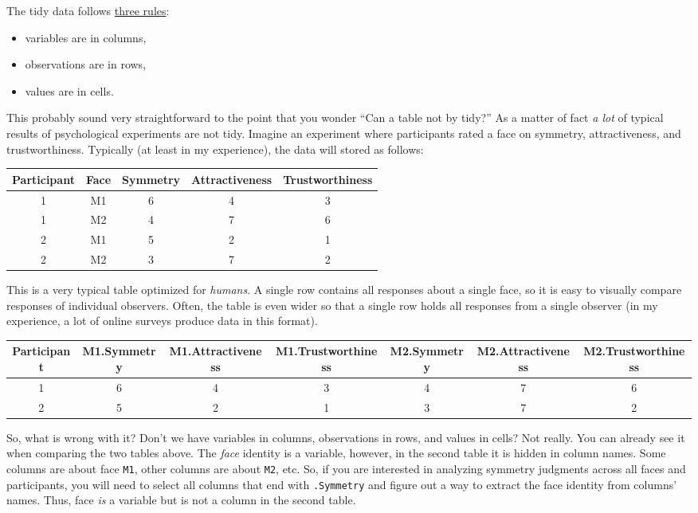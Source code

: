 \documentclass[
]{book}
\providecommand{\tightlist}{%
  \setlength{\itemsep}{0pt}\setlength{\parskip}{0pt}}
\begin{document}
The tidy data follows \href{https://r4ds.had.co.nz/tidy-data.html}{three rules}:

\begin{itemize}
\tightlist
\item
  variables are in columns,
\item
  observations are in rows,
\item
  values are in cells.
\end{itemize}

This probably sound very straightforward to the point that you wonder ``Can a table not by tidy?'' As a matter of fact \emph{a lot} of typical results of psychological experiments are not tidy. Imagine an experiment where participants rated a face on symmetry, attractiveness, and trustworthiness. Typically (at least in my experience), the data will stored as follows:

\begin{tabular}{c|c|c|c|c}
\hline
Participant & Face & Symmetry & Attractiveness & Trustworthiness\\
\hline
1 & M1 & 6 & 4 & 3\\
\hline
1 & M2 & 4 & 7 & 6\\
\hline
2 & M1 & 5 & 2 & 1\\
\hline
2 & M2 & 3 & 7 & 2\\
\hline
\end{tabular}

This is a very typical table optimized for \emph{humans}. A single row contains all responses about a single face, so it is easy to visually compare responses of individual observers. Often, the table is even wider so that a single row holds all responses from a single observer (in my experience, a lot of online surveys produce data in this format).

\begin{tabular}{c|c|c|c|c|c|c}
\hline
Participant & M1.Symmetry & M1.Attractiveness & M1.Trustworthiness & M2.Symmetry & M2.Attractiveness & M2.Trustworthiness\\
\hline
1 & 6 & 4 & 3 & 4 & 7 & 6\\
\hline
2 & 5 & 2 & 1 & 3 & 7 & 2\\
\hline
\end{tabular}

So, what is wrong with it? Don't we have variables in columns, observations in rows, and values in cells? Not really. You can already see it when comparing the two tables above. The \emph{face} identity is a variable, however, in the second table it is hidden in column names. Some columns are about face \texttt{M1}, other columns are about \texttt{M2}, etc. So, if you are interested in analyzing symmetry judgments across all faces and participants, you will need to select all columns that end with \texttt{.Symmetry} and figure out a way to extract the face identity from columns' names. Thus, face \emph{is} a variable but is not a column in the second table.
\end{document}
